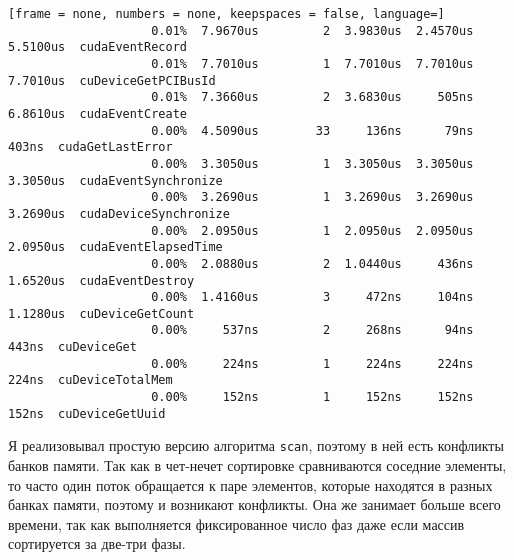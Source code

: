 \begin{lstlisting}[frame = none, numbers = none, keepspaces = false, language=]
                    0.01%  7.9670us         2  3.9830us  2.4570us  5.5100us  cudaEventRecord
                    0.01%  7.7010us         1  7.7010us  7.7010us  7.7010us  cuDeviceGetPCIBusId
                    0.01%  7.3660us         2  3.6830us     505ns  6.8610us  cudaEventCreate
                    0.00%  4.5090us        33     136ns      79ns     403ns  cudaGetLastError
                    0.00%  3.3050us         1  3.3050us  3.3050us  3.3050us  cudaEventSynchronize
                    0.00%  3.2690us         1  3.2690us  3.2690us  3.2690us  cudaDeviceSynchronize
                    0.00%  2.0950us         1  2.0950us  2.0950us  2.0950us  cudaEventElapsedTime
                    0.00%  2.0880us         2  1.0440us     436ns  1.6520us  cudaEventDestroy
                    0.00%  1.4160us         3     472ns     104ns  1.1280us  cuDeviceGetCount
                    0.00%     537ns         2     268ns      94ns     443ns  cuDeviceGet
                    0.00%     224ns         1     224ns     224ns     224ns  cuDeviceTotalMem
                    0.00%     152ns         1     152ns     152ns     152ns  cuDeviceGetUuid
\end{lstlisting}

Я реализовывал простую версию алгоритма \texttt{scan}, поэтому в ней есть конфликты банков памяти. Так как в чет-нечет сортировке сравниваются соседние элементы, то часто один поток обращается к паре элементов, которые находятся в разных банках памяти, поэтому и возникают конфликты. Она же занимает больше всего времени, так как выполняется фиксированное число фаз даже если массив сортируется за две-три фазы.
